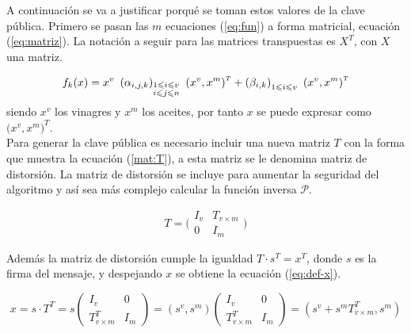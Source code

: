 A continuación se va a justificar porqué se toman estos valores de la clave pública. Primero se pasan las $m$ ecuaciones (\ref{eq:fun}) a forma matricial, ecuación (\ref{eq:matriz}). La notación a seguir para las matrices transpuestas es $X^{\scriptscriptstyle T}$, con $X$ una matriz.

\begin{equation}\label{eq:matriz} 
	f_k(x) = x^v\ \left(\alpha_{i,j,k}\right)_{\begin{subarray}{l}{1\leqslant i \leqslant v }\\ {i \leqslant j \leqslant n}\end{subarray}}\ \left(x^v, x^m \right)^{\scriptscriptstyle T} + \left(\beta_{i,k}\right)_{1\leqslant i \leqslant v }\ \left(x^v, x^m\right)^{\scriptscriptstyle T}
\end{equation}
siendo $x^v$ los vinagres y $x^m$ los aceites, por tanto $x$ se puede expresar como $\big(x^v, x^m\big)^{\scriptscriptstyle T}$.\\


Para generar la clave pública es necesario incluir una nueva matriz $T$ con la forma que muestra la ecuación (\ref{mat:T}), a esta matriz se le denomina matriz de distorsión. La matriz de distorsión se incluye para aumentar la seguridad del algoritmo y así sea más complejo calcular la función inversa $\mathcal{P}$.

\begin{equation}
	T =
	\Bigg(
	\begin{array}{c|c}
	I_v & T_{v\times m} \\
	\hline
	0 & I_m
	\end{array}
	\Bigg)
	\label{mat:T}
\end{equation}

Además la matriz de distorsión cumple la igualdad $T\cdot s^{\scriptscriptstyle T} = x ^{\scriptscriptstyle T}$, donde $s$ es la firma del mensaje, y despejando $x$ se obtiene la ecuación (\ref{eq:def-x}).

\begin{equation}
	x =  s \cdot T^{\scriptscriptstyle T} = s  \left(
	\begin{array}{c|c}
	I_v & 0 \\
	\hline
	T^{\scriptscriptstyle T}_{v \times m} & I_m
	\end{array}
	\right)
	= \left(s^v, s^m\right) \left(
	\begin{array}{c|c}
	I_v & 0 \\
	\hline
	T^{\scriptscriptstyle T}_{v \times m} & I_m
	\end{array}
	\right)
	= \left(s^v + s^m T^{\scriptscriptstyle T}_{v\times m}, s^m \right)
	\label{eq:def-x}
\end{equation}

